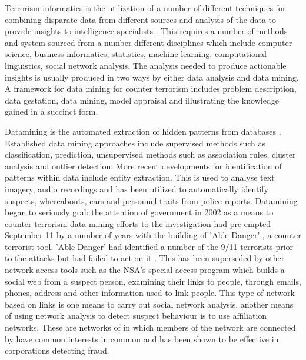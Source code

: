 Terrorism informatics is the utilization of a number of different techniques for combining disparate data from different sources and analysis of the data to  provide insights to intelligence specialists \citep{chau2015intelligence}. This requires a number of methods and system sourced from a number different disciplines which include computer science, business informatics, statistics, machine learning, computational linguistics, social network analysis. The analysis needed to produce actionable insights is usually produced in two ways by either data analysis and data mining. A framework for data mining for counter terrorism  includes problem description, data gestation, data mining, model appraisal and illustrating the knowledge gained in a succinct form.

Datamining is the automated extraction of hidden patterns from databases \citep{shmueli2016data}. Established data mining approaches include supervised methods such as  classification, prediction, unsupervised methods such as association rules, cluster analysis and outlier detection. More recent developments for identification of patterns within data include entity extraction. This is used to analyse text imagery, audio recordings and has been utilized to automatically identify suspects, whereabouts, cars and personnel traits from police reports. Datamining began to seriously grab the attention of government in 2002 as a means to counter terrorism data mining efforts to the investigation had pre-empted September 11 by a number of years with the building of 'Able Danger' , a counter terrorist tool. 'Able Danger' \citep{keefe2006can} had identified a number of the 9/11 terrorists prior to the attacks but had failed to act on it \citep{lance2006triple}. This has been superseded by other network access tools such as the NSA's special access program which builds a social web from a suspect person, examining their links to people, through emails, phones, address and other information used to link people. This type of network based on links is one means to carry out social network analysis, another means of using network analysis to detect suspect behaviour is to use affiliation networks. These are networks of in which members of the network are connected by have common interests in common and has been shown to be effective in corporations detecting fraud.

